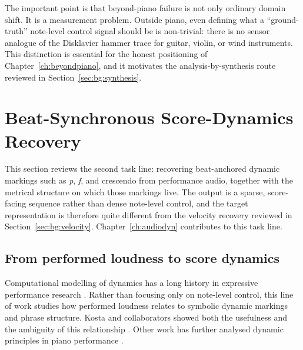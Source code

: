 The important point is that beyond-piano failure is not only ordinary domain shift. It is a measurement problem. Outside piano, even defining what a ``ground-truth'' note-level control signal should be is non-trivial: there is no sensor analogue of the Disklavier hammer trace for guitar, violin, or wind instruments. This distinction is essential for the honest positioning of Chapter~\ref{ch:beyondpiano}, and it motivates the analysis-by-synthesis route reviewed in Section~\ref{sec:bg:synthesis}.

\section{Beat-Synchronous Score-Dynamics Recovery}
\label{sec:bg:scoredyn}

This section reviews the second task line: recovering beat-anchored dynamic markings such as \textit{p}, \textit{f}, and crescendo from performance audio, together with the metrical structure on which those markings live. The output is a sparse, score-facing sequence rather than dense note-level control, and the target representation is therefore quite different from the velocity recovery reviewed in Section~\ref{sec:bg:velocity}. Chapter~\ref{ch:audiodyn} contributes to this task line.

\subsection{From performed loudness to score dynamics}
\label{sec:bg:scoredyn:loudness}

Computational modelling of dynamics has a long history in expressive performance research \cite{cancinoChacon2018computational}. Rather than focusing only on note-level control, this line of work studies how performed loudness relates to symbolic dynamic markings and phrase structure. Kosta and collaborators showed both the usefulness and the ambiguity of this relationship \cite{kosta2014dynpiano,kosta2016mapping,kosta2018mazurkabl}. Other work has further analysed dynamic principles in piano performance \cite{jones2023probingdyn}.

